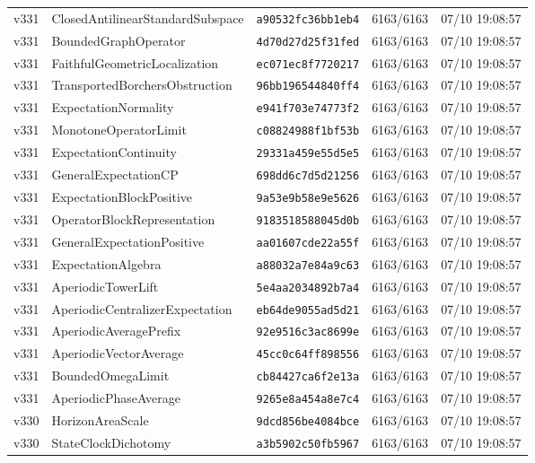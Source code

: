 \documentclass[11pt]{article}
\theoremstyle{definition}\newtheorem{deriv}{Derivation}
\begin{document}
{\begin{longtable}{@{}lllll@{}}
v331 & ClosedAntilinearStandardSubspace & \texttt{a90532fc36bb1eb4} & 6163/6163 & 07/10 19:08:57 \\
v331 & BoundedGraphOperator & \texttt{4d70d27d25f31fed} & 6163/6163 & 07/10 19:08:57 \\
v331 & FaithfulGeometricLocalization & \texttt{ec071ec8f7720217} & 6163/6163 & 07/10 19:08:57 \\
v331 & TransportedBorchersObstruction & \texttt{96bb196544840ff4} & 6163/6163 & 07/10 19:08:57 \\
v331 & ExpectationNormality & \texttt{e941f703e74773f2} & 6163/6163 & 07/10 19:08:57 \\
v331 & MonotoneOperatorLimit & \texttt{c08824988f1bf53b} & 6163/6163 & 07/10 19:08:57 \\
v331 & ExpectationContinuity & \texttt{29331a459e55d5e5} & 6163/6163 & 07/10 19:08:57 \\
v331 & GeneralExpectationCP & \texttt{698dd6c7d5d21256} & 6163/6163 & 07/10 19:08:57 \\
v331 & ExpectationBlockPositive & \texttt{9a53e9b58e9e5626} & 6163/6163 & 07/10 19:08:57 \\
v331 & OperatorBlockRepresentation & \texttt{9183518588045d0b} & 6163/6163 & 07/10 19:08:57 \\
v331 & GeneralExpectationPositive & \texttt{aa01607cde22a55f} & 6163/6163 & 07/10 19:08:57 \\
v331 & ExpectationAlgebra & \texttt{a88032a7e84a9c63} & 6163/6163 & 07/10 19:08:57 \\
v331 & AperiodicTowerLift & \texttt{5e4aa2034892b7a4} & 6163/6163 & 07/10 19:08:57 \\
v331 & AperiodicCentralizerExpectation & \texttt{eb64de9055ad5d21} & 6163/6163 & 07/10 19:08:57 \\
v331 & AperiodicAveragePrefix & \texttt{92e9516c3ac8699e} & 6163/6163 & 07/10 19:08:57 \\
v331 & AperiodicVectorAverage & \texttt{45cc0c64ff898556} & 6163/6163 & 07/10 19:08:57 \\
v331 & BoundedOmegaLimit & \texttt{cb84427ca6f2e13a} & 6163/6163 & 07/10 19:08:57 \\
v331 & AperiodicPhaseAverage & \texttt{9265e8a454a8e7c4} & 6163/6163 & 07/10 19:08:57 \\
v330 & HorizonAreaScale & \texttt{9dcd856be4084bce} & 6163/6163 & 07/10 19:08:57 \\
v330 & StateClockDichotomy & \texttt{a3b5902c50fb5967} & 6163/6163 & 07/10 19:08:57 \\

\end{longtable}}
\end{document}
